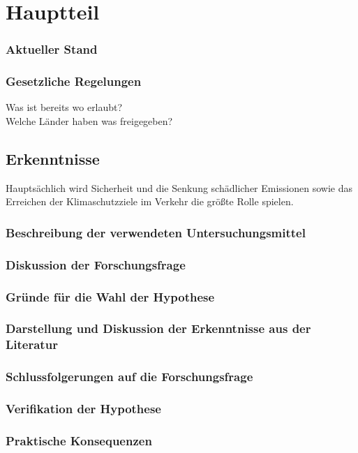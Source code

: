\chapter{Hauptteil}




\subsection{Aktueller Stand}
\subsection{Gesetzliche Regelungen}
Was ist bereits wo erlaubt?\\
Welche Länder haben was freigegeben?


\section{Erkenntnisse}
Hauptsächlich wird Sicherheit und die Senkung schädlicher Emissionen sowie das Erreichen der
Klimaschutzziele im Verkehr die größte Rolle spielen.


\subsection{Beschreibung der verwendeten Untersuchungsmittel}

\subsection{Diskussion der Forschungsfrage}

\subsection{Gründe für die Wahl der Hypothese}

\subsection{Darstellung und Diskussion der Erkenntnisse aus der Literatur}

\subsection{Schlussfolgerungen auf die Forschungsfrage}

\subsection{Verifikation der Hypothese}

\subsection{Praktische Konsequenzen}
